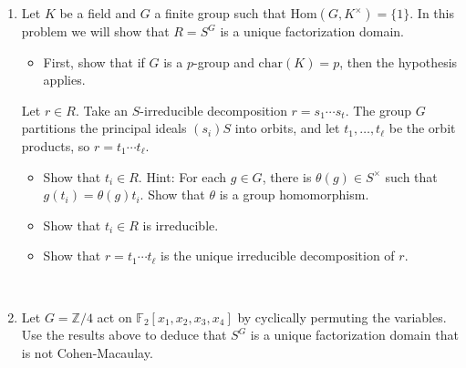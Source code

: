 \documentclass[12pt]{amsart}
\theoremstyle{definition}
\numberwithin{equation}{theorem}
\def\FF{\mathbb{F}}
\def\ZZ{\mathbb{Z}}
\begin{document}
\begin{enumerate}
\


\item Let $K$ be a field and $G$ a finite group such that $\mathrm{Hom}(G,K^\times)=\{1\}$. In this problem we will show that $R=S^G$ is a unique factorization domain.
 \begin{itemize}
  \item First, show that if $G$ is a $p$-group and $\mathrm{char}(K)=p$, then the hypothesis applies.
   \end{itemize}
\noindent Let $r\in R$. Take an $S$-irreducible decomposition $r=s_1\cdots s_t$. The group $G$ partitions the principal ideals $(s_i)S$ into orbits, and let $t_1,\dots,t_\ell$ be the orbit products, so $r=t_1\cdots t_\ell$.
 \begin{itemize}
 \item Show that $t_i \in R$. Hint: For each $g\in G$, there is $\theta(g)\in S^\times$ such that $g(t_i) = \theta(g) t_i$. Show that $\theta$ is a group homomorphism.
 \item Show that $t_i \in R$ is irreducible.
 \item Show that $r=t_1\cdots t_\ell$ is the unique irreducible decomposition of $r$.
 \end{itemize}
 
 \

\item Let $G=\ZZ/4$ act on $\FF_2[x_1, x_2,x_3,x_4]$ by cyclically permuting the variables. Use the results above to deduce that $S^G$ is a unique factorization domain that is not Cohen-Macaulay.

\



\end{enumerate}
\end{document}
